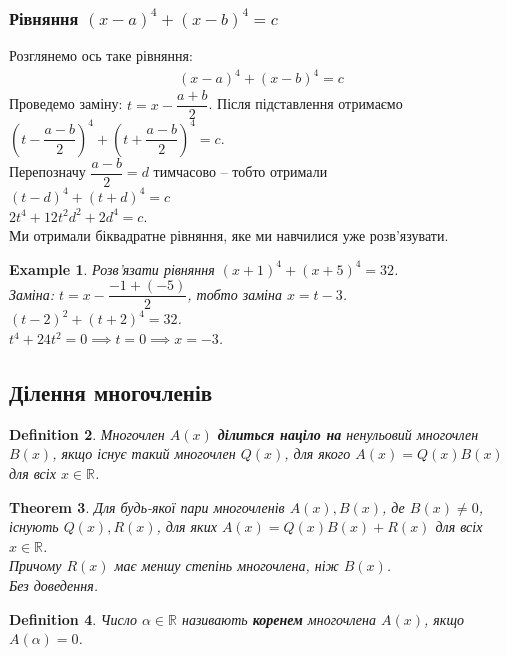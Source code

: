 \documentclass[a4paper, 10pt]{article}
\theoremstyle{theoremdd}
\newtheorem{theorem}{Theorem}[subsection]
\theoremstyle{theoremdd}
\newtheorem{definition}[theorem]{Definition}
\theoremstyle{theoremdd}
\theoremstyle{theoremdd}
\newtheorem{example}[theorem]{Example}
\theoremstyle{theoremdd}
\theoremstyle{theoremdd}
\theoremstyle{theoremdd}
\theoremstyle{theoremdd}
\begin{document}
\subsubsection{Рівняння $(x-a)^4 + (x-b)^4 = c$}
Розглянемо ось таке рівняння:
\begin{align*}
(x-a)^4 + (x-b)^4 = c
\end{align*}
Проведемо заміну: $t = x - \dfrac{a+b}{2}$. Після підставлення отримаємо\\
$\left(t - \dfrac{a-b}{2}\right)^4 + \left(t + \dfrac{a-b}{2}\right)^4 = c$.\\
Перепозначу $\dfrac{a-b}{2} = d$ тимчасово -- тобто отримали\\
$(t-d)^4 + (t+d)^4 = c$\\
$2t^4 + 12t^2d^2 + 2d^4 = c$.\\
Ми отримали біквадратне рівняння, яке ми навчилися уже розв'язувати.

\begin{example}
Розв'язати рівняння $(x+1)^4 + (x+5)^4 = 32$.\\
Заміна: $t = x - \dfrac{-1+(-5)}{2}$, тобто заміна $x = t-3$.\\
$(t-2)^2 + (t+2)^4 = 32$.\\
$t^4 + 24t^2 = 0 \implies t = 0 \implies x = -3$.
\end{example}

\subsection{Ділення многочленів}
\begin{definition}
Многочлен $A(x)$ \textbf{ділиться націло на} ненульовий многочлен $B(x)$, якщо існує такий многочлен $Q(x)$, для якого $A(x) = Q(x) B(x)$ для всіх $x \in \mathbb{R}$.
\end{definition}

\begin{theorem}
Для будь-якої пари многочленів $A(x), B(x)$, де $B(x) \neq 0$, існують $Q(x),R(x)$, для яких $A(x) = Q(x)B(x) + R(x)$ для всіх $x \in \mathbb{R}$.\\
Причому $R(x)$ має меншу степінь многочлена, ніж $B(x)$.\\
\textit{Без доведення.}
\end{theorem}

\begin{definition}
Число $\alpha \in \mathbb{R}$ називають \textbf{коренем} многочлена $A(x)$, якщо $A(\alpha) = 0$.
\end{definition}
\end{document}

